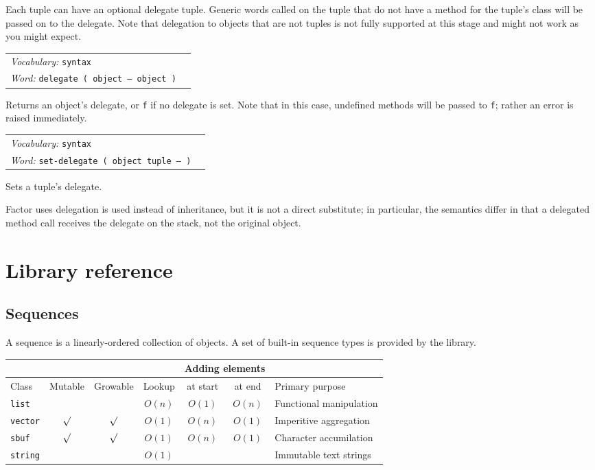 \documentclass{book}
\newcommand{\vocabulary}[1]{\emph{Vocabulary:} \texttt{#1}&\\}
\newcommand{\ordinaryword}[2]{\index{\texttt{#1}}\emph{Word:} \texttt{#2}&\\}
\newcommand{\wordtable}[1]{


\begin{tabularx}{12cm}{lX}
\hline
#1
\hline
\end{tabularx}

}
\begin{document}

Each tuple can have an optional delegate tuple. Generic words called on
the tuple that do not have a method for the tuple's class will be passed on
to the delegate. Note that delegation to objects that are not tuples is not fully supported at this stage and might not work as you might expect.
\wordtable{
\vocabulary{syntax}
\ordinaryword{delegate}{delegate ( object -- object )}

}
Returns an object's delegate, or \texttt{f} if no delegate is set. Note that in this case,  undefined methods will be passed to \texttt{f}; rather an error is raised immediately.
\wordtable{
\vocabulary{syntax}
\ordinaryword{set-delegate}{set-delegate ( object tuple -- )}

}
Sets a tuple's delegate.

Factor uses delegation is used instead of inheritance, but it is not a direct
substitute; in particular, the semantics differ in that a delegated
method call receives the delegate on the stack, not the original object.

\chapter{Library reference}

\section{Sequences}

A sequence is a linearly-ordered collection of objects. A set of built-in sequence types  is provided by the library.

\begin{tabular}[t]{l|c|c|c|c|c|l}
\multicolumn{4}{l|}{}&\multicolumn{2}{c|}{Adding elements}&\multicolumn{1}{l}{}\\
\hline
Class&Mutable&Growable&Lookup&at start&at end&Primary purpose\\
\hline
\texttt{list}&&&$O(n)$&$O(1)$&$O(n)$&Functional manipulation\\
\texttt{vector}&$\surd$&$\surd$&$O(1)$&$O(n)$&$O(1)$&Imperitive aggregation\\
\texttt{sbuf}&$\surd$&$\surd$&$O(1)$&$O(n)$&$O(1)$&Character accumilation\\
\texttt{string}&&&$O(1)$&&&Immutable text strings
\end{tabular}
\end{document}
